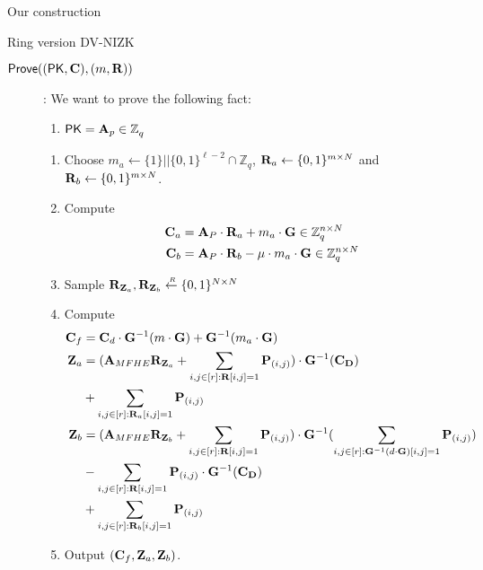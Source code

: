 \begin{section}{Our construction}
\begin{subsection}{Ring version DV-NIZK}
\begin{description}
    \item[${\mathsf{Prove}}((\mathsf{PK}, \mathbf{C}), (m, \mathbf{R}))$]:
      We want to prove the following fact:
      \begin{enumerate}
      \item $\mathsf{PK} = \mathbf{A}_p \in \mathbb{Z}_q^{}$
      \end{enumerate}
      \begin{enumerate}
      \item Choose $m_a \gets \{1\}||\{0,1\}^{\ell-2} \cap \mathbb{Z}_q$, $\mathbf{R}_a \gets \{0,1\}^{m \times N}$ and $\mathbf{R}_b \gets \{0,1\}^{m \times N}$.
      \item Compute
        \begin{align*}
          \mathbf{C}_a &= \mathbf{A}_P \cdot \mathbf{R}_a + m_a \cdot \mathbf{G} \in \mathbb{Z}_q^{n \times N}\\
          \mathbf{C}_b &= \mathbf{A}_P \cdot \mathbf{R}_b - \mu \cdot m_a \cdot \mathbf{G} \in \mathbb{Z}_q^{n \times N}          
        \end{align*}
      \item Sample $\mathbf{R}_{\mathbf{Z}_a}, \mathbf{R}_{\mathbf{Z}_b}  \stackrel{{\scriptscriptstyle \mkern4mu R}}{\gets} \{0,1\}^{N\times N}$ 
      \item Compute
        \begin{align*}
          \mathbf{C}_f &= \mathbf{C}_d \cdot \mathbf{G}^{-1}(m \cdot \mathbf{G}) + \mathbf{G}^{-1}(m_a \cdot \mathbf{G})\\
          \mathbf{Z}_a &= (\mathbf{A}_{MFHE} \mathbf{R}_{\mathbf{Z}_a}  + \sum_{i,j\in [r]: \mathbf{R}[i,j] = 1} \mathbf{P}_{(i,j)}) \cdot \mathbf{G}^{-1}(\mathbf{C}_{\mathbf{D}}) \\
          &+ \sum_{i,j \in [r]: \mathbf{R}_a[i,j]= 1}\mathbf{P}_{(i,j)}\\
          \mathbf{Z}_b &= (\mathbf{A}_{MFHE} \mathbf{R}_{\mathbf{Z}_b}  + \sum_{i,j\in [r]: \mathbf{R}[i,j] = 1} \mathbf{P}_{(i,j)}) \cdot \mathbf{G}^{-1}(\sum_{i,j\in [r]: \mathbf{G}^{-1}(d \cdot \mathbf{G})[i,j] = 1} \mathbf{P}_{(i,j)})\\
          &- \sum_{i,j\in [r]: \mathbf{R}[i,j] = 1} \mathbf{P}_{(i,j)} \cdot \mathbf{G}^{-1}(\mathbf{C}_{\mathbf{D}}) \\
          &+ \sum_{i,j \in [r]: \mathbf{R}_b[i,j]= 1}\mathbf{P}_{(i,j)}\\
        \end{align*}
      \item Output $(\mathbf{C}_f, \mathbf{Z}_a, \mathbf{Z}_b)$.
      \end{enumerate}
      

\end{description}
\end{subsection}
\end{section}
